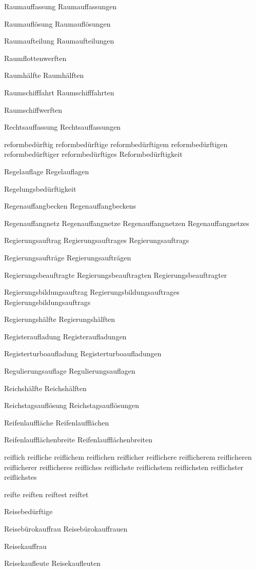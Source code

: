 Raumauffassung
Raumauffassungen

Raumauflösung
Raumauflösungen

Raumaufteilung
Raumaufteilungen

Raumflottenwerften

Raumhälfte
Raumhälften

Raumschifffahrt
Raumschifffahrten

Raumschiffwerften

Rechtsauffassung
Rechtsauffassungen

reformbedürftig
reformbedürftige
reformbedürftigem
reformbedürftigen
reformbedürftiger
reformbedürftiges
Reformbedürftigkeit

Regelauflage
Regelauflagen

Regelungsbedürftigkeit

Regenauffangbecken
Regenauffangbeckens

Regenauffangnetz
Regenauffangnetze
Regenauffangnetzen
Regenauffangnetzes

Regierungsauftrag
Regierungsauftrages
Regierungsauftrags

Regierungsaufträge
Regierungsaufträgen

Regierungsbeauftragte
Regierungsbeauftragten
Regierungsbeauftragter

Regierungsbildungsauftrag
Regierungsbildungsauftrages
Regierungsbildungsauftrags

Regierungshälfte
Regierungshälften

Registeraufladung
Registeraufladungen

Registerturboaufladung
Registerturboaufladungen

Regulierungsauflage
Regulierungsauflagen

Reichshälfte
Reichshälften

Reichstagsauflösung
Reichstagsauflösungen

Reifenlauffläche
Reifenlaufflächen

Reifenlaufflächenbreite
Reifenlaufflächenbreiten

reiflich
reifliche
reiflichem
reiflichen
reiflicher
reiflichere
reiflicherem
reiflicheren
reiflicherer
reiflicheres
reifliches
reiflichste
reiflichstem
reiflichsten
reiflichster
reiflichstes

reifte
reiften
reiftest
reiftet

Reisebedürftige

Reisebürokauffrau
Reisebürokauffrauen

Reisekauffrau

Reisekaufleute
Reisekaufleuten


